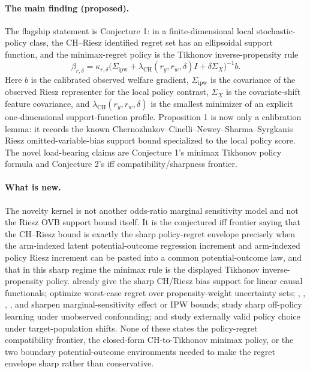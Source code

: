 \documentclass[11pt]{article}
\theoremstyle{definition}
\theoremstyle{plain}
\theoremstyle{remark}
\begin{document}
\paragraph{The main finding (proposed).}
The flagship statement is Conjecture 1: in a finite-dimensional local stochastic-policy class, the CH--Riesz identified regret set has an ellipsoidal support function, and the minimax-regret policy is the Tikhonov inverse-propensity rule
\[
  \beta_{r,\delta}=\kappa_{r,\delta}
  \bigl(\Sigma_{\mathrm{ipw}}+\lambda_{\mathrm{CH}}(r_y,r_w,\delta)I+\delta\Sigma_X\bigr)^{-1}b.
\]
Here $b$ is the calibrated observed welfare gradient, $\Sigma_{\mathrm{ipw}}$ is the covariance of the observed Riesz representer for the local policy contrast, $\Sigma_X$ is the covariate-shift feature covariance, and $\lambda_{\mathrm{CH}}(r_y,r_w,\delta)$ is the smallest minimizer of an explicit one-dimensional support-function profile. Proposition 1 is now only a calibration lemma: it records the known Chernozhukov--Cinelli--Newey--Sharma--Syrgkanis Riesz omitted-variable-bias support bound specialized to the local policy score. The novel load-bearing claims are Conjecture 1's minimax Tikhonov policy formula and Conjecture 2's iff compatibility/sharpness frontier.

\paragraph{What is new.}
The novelty kernel is not another odds-ratio marginal sensitivity model and not the Riesz OVB support bound itself. It is the conjectured iff frontier saying that the CH--Riesz bound is exactly the sharp policy-regret envelope precisely when the arm-indexed latent potential-outcome regression increment and arm-indexed policy Riesz increment can be pasted into a common potential-outcome law, and that in this sharp regime the minimax rule is the displayed Tikhonov inverse-propensity policy. \citet{ChernozhukovCinelliNeweySharmaSyrgkanis2022} already give the sharp CH/Riesz bias support for linear causal functionals; \citet{KallusZhou2021} optimize worst-case regret over propensity-weight uncertainty sets; \citet{Tan2006}, \citet{ZhaoSmallBhattacharya2019}, \citet{DornGuo2023}, \citet{YadlowskyNamkoongBasuDuchiTian2022}, and \citet{DornGuoKallus2025} sharpen marginal-sensitivity effect or IPW bounds; \citet{HessFrauenMelnychukFeuerriegel2026} study sharp off-policy learning under unobserved confounding; and \citet{AdjahoChristensen2025} study externally valid policy choice under target-population shifts. None of these states the policy-regret compatibility frontier, the closed-form CH-to-Tikhonov minimax policy, or the two boundary potential-outcome environments needed to make the regret envelope sharp rather than conservative.
\end{document}
